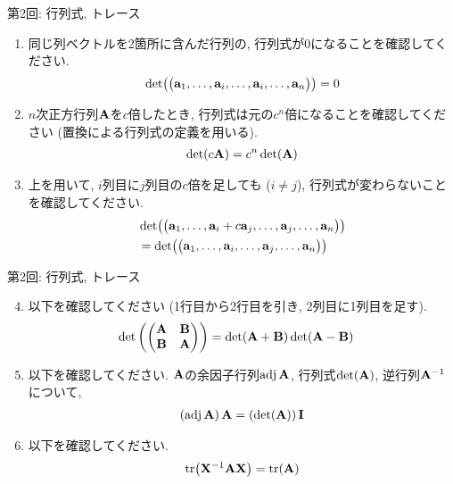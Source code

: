 \documentclass[dvipdfmx,notheorems,t]{beamer}
\begin{document}
\begin{frame}{第2回: 行列式, トレース}
\begin{enumerate}
  \item 同じ列ベクトルを2箇所に含んだ行列の, 行列式が$0$になることを確認してください.
  \begin{align*}
    \det(\mqty(\vb{a}_1, \ldots, \vb{a}_i, \ldots, \vb{a}_i, \ldots, \vb{a}_n)) = 0
  \end{align*}
  \item $n$次正方行列$\vb{A}$を$c$倍したとき, 行列式は元の$c^n$倍になることを確認してください (置換による行列式の定義を用いる).
  \begin{align*}
    \det(c \vb{A}) = c^n \det(\vb{A})
  \end{align*}
  \item 上を用いて, $i$列目に$j$列目の$c$倍を足しても ($i \neq j$), 行列式が変わらないことを確認してください.
  \begin{align*}
    & \det(\mqty(\vb{a}_1, \ldots, \vb{a}_i + c \vb{a}_j, \ldots, \vb{a}_j, \ldots, \vb{a}_n)) \\
      &= \det(\mqty(\vb{a}_1, \ldots, \vb{a}_i, \ldots, \vb{a}_j, \ldots, \vb{a}_n))
  \end{align*}
\end{enumerate}
\end{frame}

\begin{frame}{第2回: 行列式, トレース}
\begin{enumerate}
  \setcounter{enumi}{3}
  \item 以下を確認してください (1行目から2行目を引き, 2列目に1列目を足す).
  \begin{align*}
    \det\left( \mqty(\vb{A} & \vb{B} \\ \vb{B} & \vb{A}) \right)
      &= \det(\vb{A} + \vb{B}) \det(\vb{A} - \vb{B})
  \end{align*}
  \item 以下を確認してください.
  $\vb{A}$の余因子行列$\operatorname{adj} \vb{A}$, 行列式$\det(\vb{A})$, 逆行列$\vb{A}^{-1}$について,
  \begin{align*}
    \left( \operatorname{adj} \vb{A} \right) \vb{A} = \left( \det(\vb{A}) \right) \vb{I}
  \end{align*}
  \item 以下を確認してください.
  \begin{align*}
    \tr(\vb{X}^{-1} \vb{A} \vb{X}) = \tr(\vb{A})
  \end{align*}
\end{enumerate}
\end{frame}
\end{document}

